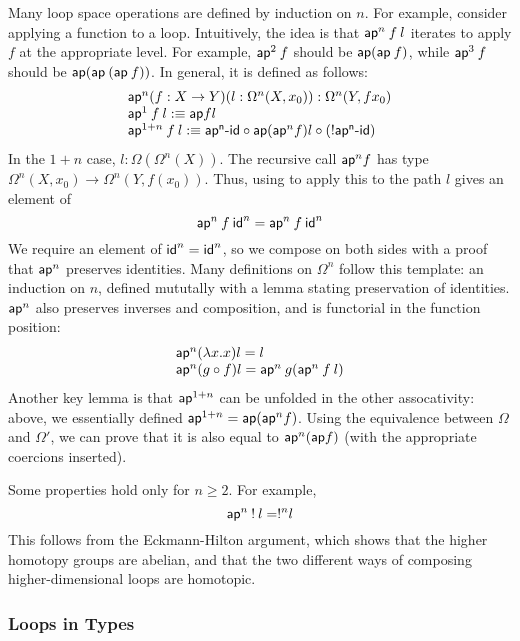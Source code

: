 Many loop space operations are  defined by induction on $n$.  For
example, consider applying a function to a loop.  Intuitively, the idea
is that $\mathsf{ap}^n \: f \: l$ iterates  to apply $f$ at the
appropriate level.  For example, $\mathsf{ap}^2 \: f$ should be $\mathsf{ap}
(\mathsf{ap} \: f)$, while $\mathsf{ap}^3 \: f$ should be $\mathsf{ap}
(\mathsf{ap} \: (\mathsf{ap} \: f))$.  In general, it is defined as follows:
\[
\begin{array}{l}
\mathsf{ap}^n (f : X \to Y) (l : \Omega^n(X,x_0)) : \Omega^n(Y,f x_0) \\
\mathsf{ap}^1 \: f \: l :\equiv \mathsf{ap} f l \\
\mathsf{ap}^{1+n} \: f \: l :\equiv \mathsf{ap^n\text{-}id } \mathbin{\circ} \mathsf{ap} (\mathsf{ap}^n f) l \mathbin{\circ} (! \mathsf{ap^n\text{-}id }) \\
\end{array}
\]
In the $1+n$ case, $l : \Omega(\Omega^n(X))$.  The recursive call
$\mathsf{ap}^n f$ has type $\Omega^n(X,x_0) \to \Omega^n(Y, f(x_0))$.  Thus, 
using  to apply this to the path $l$ gives an element of 
\[
\mathsf{ap}^n \: f \: \mathsf{id}^n = \mathsf{ap}^n \: f \: \mathsf{id}^n
\]
We require an element of $\mathsf{id}^{n} = \mathsf{id}^n$, so we compose on
both sides with a proof  that $\mathsf{ap}^n$
preserves identities.  Many definitions on $\Omega^n$ follow this
template: an induction on $n$, defined mututally with a lemma stating
preservation of identities.  $\mathsf{ap}^n$ also preserves inverses and
composition, and is functorial in the function position:
\[
\begin{array}{l}
\mathsf{ap}^n(\lambda x.x) l = l \\
\mathsf{ap}^n(g \mathbin{\circ} f) l = \mathsf{ap}^n \: g (\mathsf{ap}^n \: f \: l) 
\end{array}
\]
Another key lemma is that $\mathsf{ap}^{1+n}$ can be unfolded in the other
assocativity: above, we essentially defined $\mathsf{ap}^{1+n} =
\mathsf{ap}(\mathsf{ap}^n f)$.  Using the equivalence between $\Omega$ and
$\Omega'$, we can prove that it is also equal to $\mathsf{ap}^n(\mathsf{ap}
f)$ (with the appropriate coercions inserted).   

Some properties hold only for $n\ge2$.  For example, 
\[
\mathsf{ap}^n \: ! \: l = !^n l 
\]
This follows from the Eckmann-Hilton argument, which shows that the
higher homotopy groups are abelian, and that the two different ways of
composing higher-dimensional loops are homotopic.  

\subsubsection{Loops in Types}

